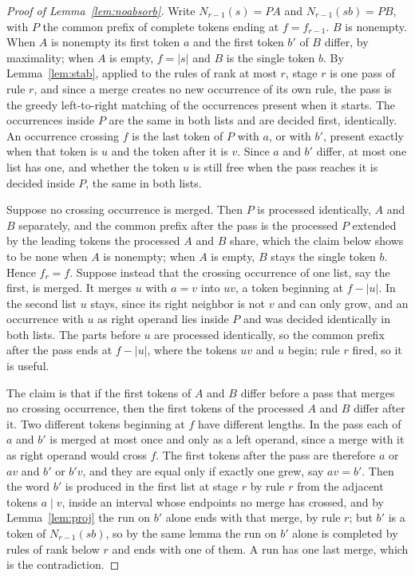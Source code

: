 \documentclass[11pt,a4paper]{article}
\theoremstyle{definition}
\theoremstyle{plain}
\begin{document}
\begin{proof}[Proof of Lemma~\ref{lem:noabsorb}]
Write \(N_{r-1}(s) = P A\) and \(N_{r-1}(sb) = P B\), with \(P\) the common prefix of complete tokens ending at
\(f = f_{r-1}\). \(B\) is nonempty. When \(A\) is nonempty its first token \(a\) and the first token \(b'\) of \(B\)
differ, by maximality; when \(A\) is empty, \(f = |s|\) and \(B\) is the single token \(b\). By Lemma~\ref{lem:stab},
applied to the rules of rank at most \(r\), stage \(r\) is one pass of rule \(r\), and since a merge creates no new
occurrence of its own rule, the pass is the greedy left-to-right matching of the occurrences present when it starts. The
occurrences inside \(P\) are the same in both lists and are decided first, identically. An occurrence crossing \(f\) is
the last token of \(P\) with \(a\), or with \(b'\), present exactly when that token is \(u\) and the token after it is
\(v\). Since \(a\) and \(b'\) differ, at most one list has one, and whether the token \(u\) is still free when the pass
reaches it is decided inside \(P\), the same in both lists.

Suppose no crossing occurrence is merged. Then \(P\) is processed identically, \(A\) and \(B\) separately, and the
common prefix after the pass is the processed \(P\) extended by the leading tokens the processed \(A\) and \(B\) share,
which the claim below shows to be none when \(A\) is nonempty; when \(A\) is empty, \(B\) stays the single token \(b\).
Hence \(f_r = f\). Suppose instead that the crossing occurrence of one list, say the first, is merged. It merges \(u\)
with \(a = v\) into \(uv\), a token beginning at \(f - |u|\). In the second list \(u\) stays, since its right neighbor
is not \(v\) and can only grow, and an occurrence with \(u\) as right operand lies inside \(P\) and was decided
identically in both lists. The parts before \(u\) are processed identically, so the common prefix after the pass ends at
\(f - |u|\), where the tokens \(uv\) and \(u\) begin; rule \(r\) fired, so it is useful.

The claim is that if the first tokens of \(A\) and \(B\) differ before a pass that merges no crossing occurrence, then
the first tokens of the processed \(A\) and \(B\) differ after it. Two different tokens beginning at \(f\) have
different lengths. In the pass each of \(a\) and \(b'\) is merged at most once and only as a left operand, since a merge
with it as right operand would cross \(f\). The first tokens after the pass are therefore \(a\) or \(av\) and \(b'\) or
\(b'v\), and they are equal only if exactly one grew, say \(av = b'\). Then the word \(b'\) is produced in the first
list at stage \(r\) by rule \(r\) from the adjacent tokens \(a \mid v\), inside an interval whose endpoints no merge has
crossed, and by Lemma~\ref{lem:proj} the run on \(b'\) alone ends with that merge, by rule \(r\); but \(b'\) is a token
of \(N_{r-1}(sb)\), so by the same lemma the run on \(b'\) alone is completed by rules of rank below \(r\) and ends with
one of them. A run has one last merge, which is the contradiction.
\end{proof}
\end{document}
